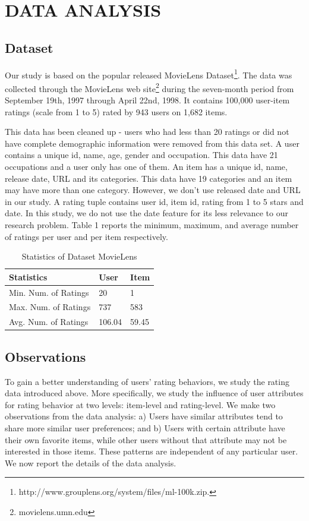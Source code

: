 \documentclass{llncs}
\begin{document}
	\section{DATA ANALYSIS}
	\subsection{Dataset}
	Our study is based on the popular released MovieLens Dataset\footnote{http://www.grouplens.org/system/files/ml-100k.zip.}.
	The data was collected through the MovieLens web site\footnote{movielens.umn.edu} during the seven-month period from September 19th,
	1997 through April 22nd, 1998. It contains 100,000 user-item ratings (scale from 1 to 5) rated by 943 users on 1,682 items.
	
	This data has been cleaned up \-- users who had less than 20 ratings or did not have complete demographic
	information were removed from this data set. A user contains a unique id, name, age, gender and occupation.
	This data have 21 occupations and a user only has one of them. An item has a unique id, name, release date, URL
	and its categories. This data have 19 categories and an item may have more than one category.
	However, we don't use released date and URL in our study. A rating tuple contains user id, item id, rating from 1 to 5 stars and date.
	In this study, we do not use the date feature for its less relevance to our research problem.
	Table 1 reports the minimum, maximum, and average number of ratings per user and per item respectively.
	\begin{table}\label{DataSet}
		\centering
		\caption{Statistics of Dataset MovieLens}
		\begin{tabular}{l|l|l} \hline
			Statistics& User &Item\\ \hline
			Min. Num. of Ratings& 20& 1 \\ \hline
			Max. Num. of Ratings& 737 &583\\ \hline
			Avg. Num. of Ratings& 106.04 &59.45\\ \hline
		\end{tabular}
	\end{table}
	\subsection{Observations}
	
	To gain a better understanding of users' rating behaviors, we
	study the rating data introduced above.
	More specifically, we study the influence of user attributes for rating behavior at two levels: item-level
	and rating-level. We make two observations from the data analysis: a) Users have similar attributes tend to share more similar user
	preferences; and b) Users with certain attribute have their own favorite items, while other users without that attribute may not be interested in
	those items. These patterns are independent of
	any particular user. We now report the details of the data analysis.
    \\
	
\end{document}
